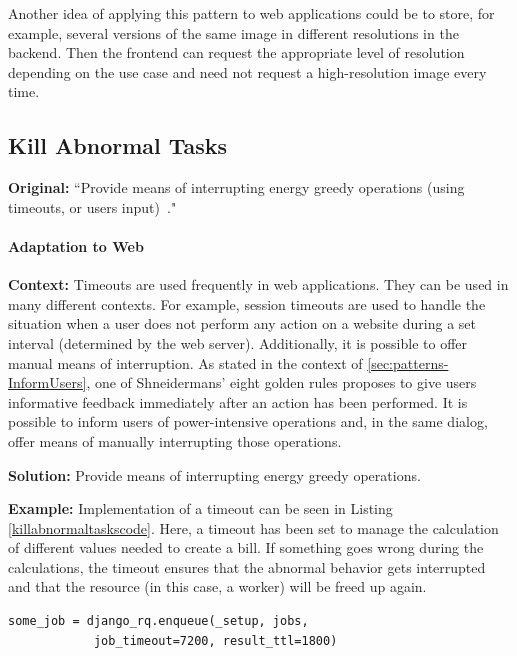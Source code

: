 Another idea of applying this pattern to web applications could be to store, for example, several versions of the same image in different resolutions in the backend. Then the frontend can request the appropriate level of resolution depending on the use case and need not request a high-resolution image every time.


\subsection{Kill Abnormal Tasks} \label{sec:patterns-KillAbnormalTasks}
\textbf{Original:} ``Provide means of interrupting energy greedy operations (\eg using timeouts, or users input)~\cite{cruz2019catalog}."

\paragraph{Adaptation to Web}\mbox{}

\textbf{Context:} Timeouts are used frequently in web applications. They can be used in many different contexts. For example, session timeouts are used to handle the situation when a user does not perform any action on a website during a set interval (determined by the web server). Additionally, it is possible to offer manual means of interruption. As stated in the context of \ref{sec:patterns-InformUsers}, one of Shneidermans' eight golden rules proposes to give users informative feedback immediately after an action has been performed. It is possible to inform users of power-intensive operations and, in the same dialog, offer means of manually interrupting those operations.

\textbf{Solution:} Provide means of interrupting energy greedy operations.

\textbf{Example:} Implementation of a timeout can be seen in Listing \ref{killabnormaltaskscode}. Here, a timeout has been set to manage the calculation of different values needed to create a bill. If something goes wrong during the calculations, the timeout ensures that the abnormal behavior gets interrupted and that the resource (in this case, a worker) will be freed up again.

\begin{minipage}{0.95\linewidth}
    \begin{lstlisting}[caption={Example of a timeout.},label={killabnormaltaskscode}]
    some_job = django_rq.enqueue(_setup, jobs, 
            job_timeout=7200, result_ttl=1800)
    \end{lstlisting}
\end{minipage}


